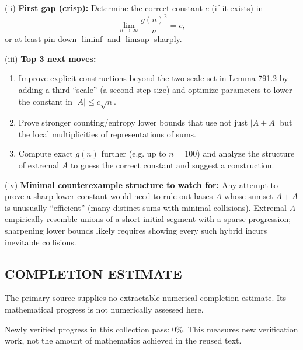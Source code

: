 (ii) \textbf{First gap (crisp):} Determine the correct constant $c$ (if it exists) in
\[\lim_{n\to\infty} \frac{g(n)^2}{n}=c,
\]
or at least pin down $\liminf$ and $\limsup$ sharply.

(iii) \textbf{Top 3 next moves:}
\begin{enumerate}
\item Improve explicit constructions beyond the two-scale set in Lemma 791.2 by adding a third ``scale'' (a second step size) and optimize parameters to lower the constant in $|A|\le c\sqrt n$.
\item Prove stronger counting/entropy lower bounds that use not just $|A+A|$ but the local multiplicities of representations of sums.
\item Compute exact $g(n)$ further (e.g. up to $n=100$) and analyze the structure of extremal $A$ to guess the correct constant and suggest a construction.
\end{enumerate}

(iv) \textbf{Minimal counterexample structure to watch for:} Any attempt to prove a sharp lower constant would need to rule out bases $A$ whose sumset $A+A$ is unusually ``efficient'' (many distinct sums with minimal collisions). Extremal $A$ empirically resemble unions of a short initial segment with a sparse progression; sharpening lower bounds likely requires showing every such hybrid incurs inevitable collisions.

\bigskip



\subsection*{COMPLETION ESTIMATE}
The primary source supplies no extractable numerical completion estimate. Its mathematical progress is not numerically assessed here.

Newly verified progress in this collection pass: $0\%$. This measures new verification work, not the amount of mathematics achieved in the reused text.
